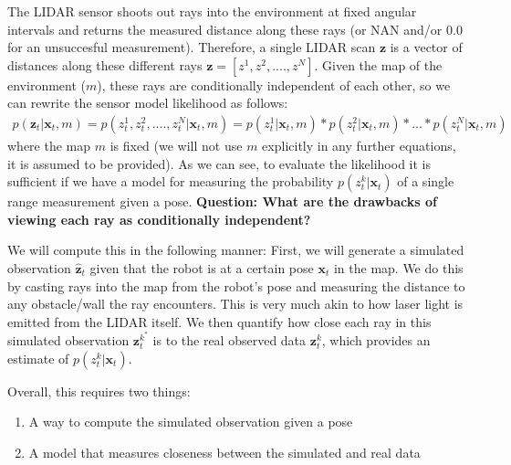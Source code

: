 \documentclass[final]{article}
\begin{document}
The LIDAR sensor shoots out rays into the environment at fixed angular intervals and returns the measured distance along these rays (or NAN and/or 0.0 for an unsuccesful measurement). Therefore, a single LIDAR scan $\mathbf{z}$ is a vector of distances along these different rays $\mathbf{z} = \left[z^1, z^2, ...., z^N\right]$. Given the map of the environment ($m$), these rays are conditionally independent of each other, so we can rewrite the sensor model likelihood as follows:
\begin{align}
p(\mathbf{z}_t | \mathbf{x}_t, m) = p(z_t^1, z_t^2, ...., z_t^N | \mathbf{x}_t, m) = p(z_t^1 | \mathbf{x}_t, m) * p(z_t^2 | \mathbf{x}_t, m) * ... * p(z_t^N | \mathbf{x}_t ,m )
\end{align}
where the map $m$ is fixed (we will not use $m$ explicitly in any further equations, it is assumed to be provided). As we can see, to evaluate the likelihood it is sufficient if we have a model for measuring the probability $p(z_t^k | \mathbf{x}_t)$ of a single range measurement given a pose.\newline
\break
\textbf{Question: What are the drawbacks of viewing each ray as conditionally independent?}

We will compute this in the following manner: First, we will generate a simulated observation $\hat{\mathbf{z}}_t$ given that the robot is at a certain pose $\mathbf{x}_t$ in the map. We do this by casting rays into the map from the robot's pose and measuring the distance to any obstacle/wall the ray encounters. This is very much akin to how laser light is emitted from the LIDAR itself. We then quantify how close each ray in this simulated observation $\mathbf{z}_t^{k^*}$ is to the real observed data $\mathbf{z}^k_t$, which provides an estimate of $p(z_t^k | \mathbf{x}_t)$. 

Overall, this requires two things: 
\begin{enumerate}
\item A way to compute the simulated observation given a pose
\item A model that measures closeness between the simulated and real data
\end{enumerate}
\end{document}
